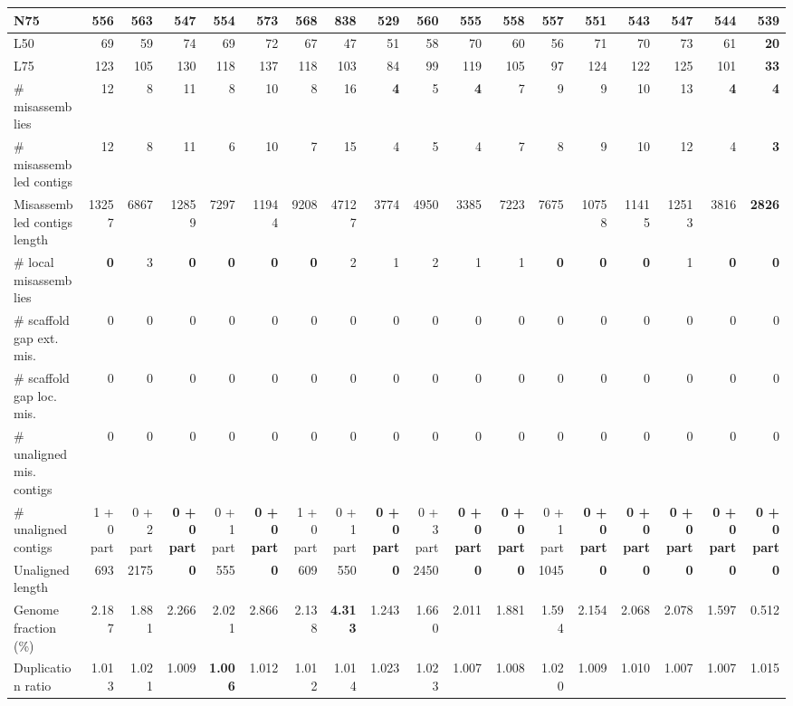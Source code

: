 \documentclass[12pt,a4paper]{article}
\begin{document}
\begin{table}[ht]
\begin{center}
\begin{tabular}{|l*{17}{|r}|}
N75 & 556 & 563 & 547 & 554 & 573 & 568 & {\bf 838} & 529 & 560 & 555 & 558 & 557 & 551 & 543 & 547 & 544 & 539 \\ \hline
L50 & 69 & 59 & 74 & 69 & 72 & 67 & 47 & 51 & 58 & 70 & 60 & 56 & 71 & 70 & 73 & 61 & {\bf 20} \\ \hline
L75 & 123 & 105 & 130 & 118 & 137 & 118 & 103 & 84 & 99 & 119 & 105 & 97 & 124 & 122 & 125 & 101 & {\bf 33} \\ \hline
\# misassemblies & 12 & 8 & 11 & 8 & 10 & 8 & 16 & {\bf 4} & 5 & {\bf 4} & 7 & 9 & 9 & 10 & 13 & {\bf 4} & {\bf 4} \\ \hline
\# misassembled contigs & 12 & 8 & 11 & 6 & 10 & 7 & 15 & 4 & 5 & 4 & 7 & 8 & 9 & 10 & 12 & 4 & {\bf 3} \\ \hline
Misassembled contigs length & 13257 & 6867 & 12859 & 7297 & 11944 & 9208 & 47127 & 3774 & 4950 & 3385 & 7223 & 7675 & 10758 & 11415 & 12513 & 3816 & {\bf 2826} \\ \hline
\# local misassemblies & {\bf 0} & 3 & {\bf 0} & {\bf 0} & {\bf 0} & {\bf 0} & 2 & 1 & 2 & 1 & 1 & {\bf 0} & {\bf 0} & {\bf 0} & 1 & {\bf 0} & {\bf 0} \\ \hline
\# scaffold gap ext. mis. & 0 & 0 & 0 & 0 & 0 & 0 & 0 & 0 & 0 & 0 & 0 & 0 & 0 & 0 & 0 & 0 & 0 \\ \hline
\# scaffold gap loc. mis. & 0 & 0 & 0 & 0 & 0 & 0 & 0 & 0 & 0 & 0 & 0 & 0 & 0 & 0 & 0 & 0 & 0 \\ \hline
\# unaligned mis. contigs & 0 & 0 & 0 & 0 & 0 & 0 & 0 & 0 & 0 & 0 & 0 & 0 & 0 & 0 & 0 & 0 & 0 \\ \hline
\# unaligned contigs & 1 + 0 part & 0 + 2 part & {\bf 0 + 0 part} & 0 + 1 part & {\bf 0 + 0 part} & 1 + 0 part & 0 + 1 part & {\bf 0 + 0 part} & 0 + 3 part & {\bf 0 + 0 part} & {\bf 0 + 0 part} & 0 + 1 part & {\bf 0 + 0 part} & {\bf 0 + 0 part} & {\bf 0 + 0 part} & {\bf 0 + 0 part} & {\bf 0 + 0 part} \\ \hline
Unaligned length & 693 & 2175 & {\bf 0} & 555 & {\bf 0} & 609 & 550 & {\bf 0} & 2450 & {\bf 0} & {\bf 0} & 1045 & {\bf 0} & {\bf 0} & {\bf 0} & {\bf 0} & {\bf 0} \\ \hline
Genome fraction (\%) & 2.187 & 1.881 & 2.266 & 2.021 & 2.866 & 2.138 & {\bf 4.313} & 1.243 & 1.660 & 2.011 & 1.881 & 1.594 & 2.154 & 2.068 & 2.078 & 1.597 & 0.512 \\ \hline
Duplication ratio & 1.013 & 1.021 & 1.009 & {\bf 1.006} & 1.012 & 1.012 & 1.014 & 1.023 & 1.023 & 1.007 & 1.008 & 1.020 & 1.009 & 1.010 & 1.007 & 1.007 & 1.015 \\ \hline

\end{tabular}
\end{center}
\end{table}
\end{document}

